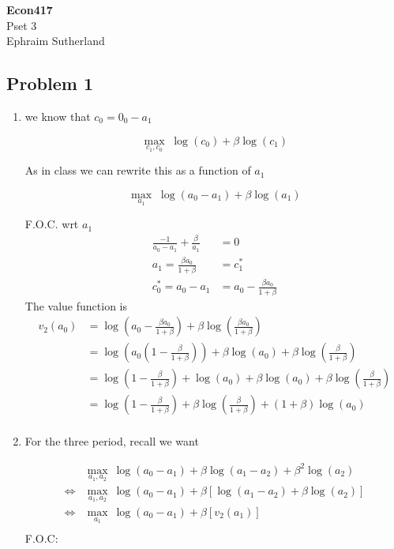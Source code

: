 \documentclass[12pt]{article}
\begin{document}
\begin{center}
{\large \bf Econ417 }   \\ \large Pset 3 \\ Ephraim Sutherland
\end{center}

\subsection*{Problem 1}
\begin{enumerate}

\item we know that $c_0 = 0_0 - a_1$ 

	$$\max_{c_1, c_0} \; \log(c_0) + \beta \log(c_1)$$
	
	As in class we can rewrite this as a function of $a_1$

	$$\max_{a_1} \; \log(a_0 - a_1) + \beta \log(a_1)$$
	
	F.O.C. wrt $a_1$
	\begin{align*}
		\frac{-1}{a_0 - a_1} + \frac{\beta}{a_1} &= 0 \\
		a_1 = \frac{\beta a_0}{1 + \beta} &= c_1^* \\
		c_0^* = a_0 - a_1 &= a_0 - \frac{\beta a_0}{1 + \beta}
	\end{align*}
	The value function is 
	\begin{align*}
		v_2(a_0) &= \log(a_0 - \frac{\beta a_0}{1 + \beta}) + \beta \log(\frac{\beta a_0}{1 + \beta} ) \\
		       &= \log(a_0(1 - \frac{\beta}{1 + \beta})) + \beta \log(a_0) + \beta \log(\frac{\beta }{1 + \beta} ) \\
		       &= \log(1 - \frac{\beta}{1 + \beta}) + \log(a_0) + \beta \log(a_0) + \beta \log(\frac{\beta }{1 + \beta} ) \\
		       &= \log(1 - \frac{\beta}{1 + \beta}) + \beta \log(\frac{\beta }{1 + \beta} ) + (1 + \beta) \log(a_0)  \\
	\end{align*}

\item For the three period, recall we want

	\begin{align*}
		&\max_{a_1, a_2} \: \log(a_0 - a_1) + \beta \log(a_1 - a_2)  + \beta^2 \log(a_2)  \\
\iff 
&\max_{a_1, a_2} \: \log(a_0 - a_1) + \beta \left[ \log(a_1 - a_2)  + \beta \log(a_2)  \right ] \\
\iff 
&\max_{a_1} \: \log(a_0 - a_1) + \beta \left[ v_2(a_1) \right] \\
\end{align*}
F.O.C:


\end{enumerate}
\end{document}
